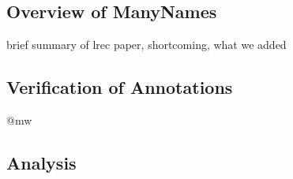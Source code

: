 

\subsection{Overview of ManyNames}
\label{sect:mn_overview}

brief summary of lrec paper, shortcoming, what we added

\subsection{Verification of Annotations}
\label{sect:mn_verification}

@mw

\subsection{Analysis}
\label{sect:mn_analysis}



